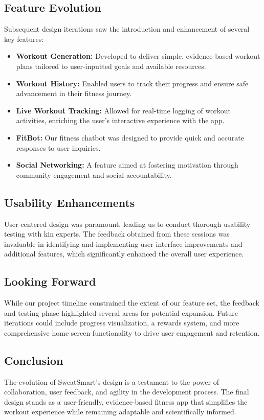 \documentclass{article}
\begin{document}
\subsection{Feature Evolution}
Subsequent design iterations saw the introduction and enhancement of several key features:

\begin{itemize}
  \item \textbf{Workout Generation:} Developed to deliver simple, evidence-based workout plans tailored to user-inputted goals and available resources.
  \item \textbf{Workout History:} Enabled users to track their progress and ensure safe advancement in their fitness journey.
  \item \textbf{Live Workout Tracking:} Allowed for real-time logging of workout activities, enriching the user's interactive experience with the app.
  \item \textbf{FitBot:} Our fitness chatbot was designed to provide quick and accurate responses to user inquiries.
  \item \textbf{Social Networking:} A feature aimed at fostering motivation through community engagement and social accountability.
\end{itemize}

\subsection{Usability Enhancements}
User-centered design was paramount, leading us to conduct thorough usability testing with kin experts. The feedback obtained from these sessions was invaluable in identifying and implementing user interface improvements and additional features, which significantly enhanced the overall user experience.

\subsection{Looking Forward}
While our project timeline constrained the extent of our feature set, the feedback and testing phase highlighted several areas for potential expansion. Future iterations could include progress visualization, a rewards system, and more comprehensive home screen functionality to drive user engagement and retention.

\subsection{Conclusion}
The evolution of SweatSmart's design is a testament to the power of collaboration, user feedback, and agility in the development process. The final design stands as a user-friendly, evidence-based fitness app that simplifies the workout experience while remaining adaptable and scientifically informed.
\end{document}
